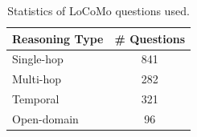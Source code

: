 \begin{table}[t]
\centering
\begin{tabular}{l|c}
\toprule
\textbf{Reasoning Type} & \textbf{\# Questions} \\
\midrule
Single-hop & 841 \\
Multi-hop & 282 \\
Temporal & 321 \\
Open-domain & 96 \\
\bottomrule
\end{tabular}
\caption{Statistics of LoCoMo questions used.}
\label{tab:locomo_stats}
\end{table}